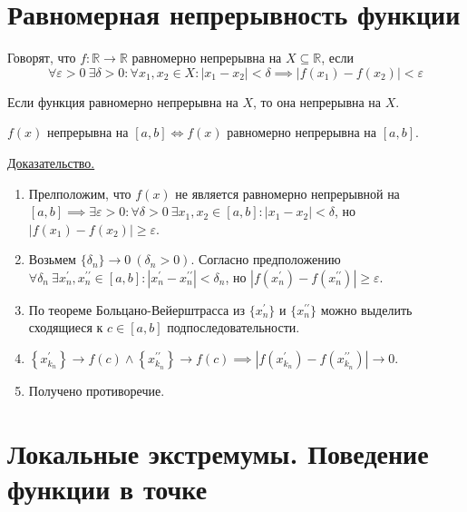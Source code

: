 \documentclass{article}
\begin{document}
\section{Равномерная непрерывность функции}

\begin{definition}
    Говорят, что \(f: \mathbb{R} \to \mathbb{R}\) равномерно непрерывна на \(X \subseteq \mathbb{R}\), если 
    \[
        \forall \varepsilon > 0\ \exists \delta > 0: \forall x_1, x_2 \in X: \left\vert x_1 - x_2 \right\vert < \delta \implies \left\vert f(x_1) - f(x_2) \right\vert < \varepsilon
    \]   
\end{definition}

\begin{claim}
    Если функция равномерно непрерывна на \(X\), то она непрерывна на \(X\).  
\end{claim}

\begin{theorem}[Кантора]
    \(f(x)\) непрерывна на \({[a, b]} \iff f(x)\) равномерно непрерывна на \({[a, b]}\).   
\end{theorem}
\noindent \underline{Доказательство.}
\begin{enumerate}
    \item Прелположим, что \(f(x)\) не является равномерно непрерывной на \(\displaystyle {[a, b]} \implies \exists \varepsilon > 0: \forall \delta > 0\ \exists x_1, x_2 \in {[a, b]}: \left\vert x_1 - x_2 \right\vert < \delta\), но \(\left\vert f(x_1) - f(x_2) \right\vert \geq \varepsilon\).
    \item Возьмем \(\{\delta_n\} \to 0\ (\delta_n > 0)\). Согласно предположению \(\displaystyle \forall \delta_n\ \exists x^{\prime}_n, x^{\prime\prime}_n  \in {[a, b]}: \left\vert x^{\prime}_n  - x^{\prime\prime}_n  \right\vert < \delta_n\), но \(\left\vert f(x^{\prime}_n) - f(x^{\prime\prime}_n ) \right\vert \geq \varepsilon\).
    \item По теореме Больцано-Вейерштрасса из \(\{x^{\prime}_n\}\) и \(\{x^{\prime\prime}_n\}\)  можно выделить сходящиеся к \(c \in {[a, b]}\)  подпоследовательности.
    \item \(\displaystyle \left\{x^{\prime}_{k_n}\right\} \to f(c) \land \left\{x^{\prime\prime}_{k_n}\right\} \to f(c) \implies \left\vert f(x^{\prime}_{k_n}) - f(x^{\prime\prime}_{k_n})\right\vert \to 0\).
    \item Получено противоречие. 
\end{enumerate}

\section{Локальные экстремумы. Поведение функции в точке}
\end{document}
